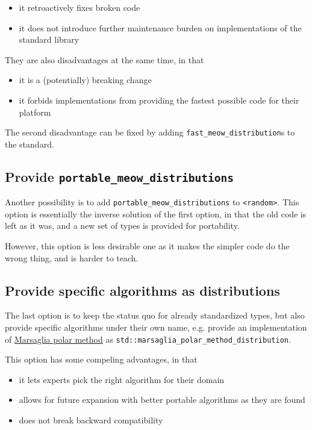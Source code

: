 \documentclass{wg21}
\begin{document}
\begin{itemize}
    \item it retroactively fixes broken code
    \item it does not introduce further maintenance burden on implementations of the standard library
\end{itemize}

They are also disadvantages at the same time, in that

\begin{itemize}
    \item it is a (potentially) breaking change
    \item it forbids implementations from providing the fastest possible code for their platform
\end{itemize}


The second disadvantage can be fixed by adding \texttt{fast_meow_distribution}s
to the standard.


\hypertarget{portable-overloads}{%
    \subsection{Provide \texttt{portable_meow_distributions}}\label{portable-overloads}}

Another possibility is to add \texttt{portable_meow_distributions}
to \texttt{<random>}. This option is essentially the inverse solution
of the first option, in that the old code is left as it was, and
a new set of types is provided for portability.

However, this option is less desirable one as it makes the simpler code
do the wrong thing, and is harder to teach.

\hypertarget{specific-algorithms}{%
    \subsection{Provide specific algorithms as distributions}\label{specific-algorithms}}

The last option is to keep the status quo for already standardized types,
but also provide specific algorithms under their own name, e.g. provide
an implementation of
\href{https://en.wikipedia.org/wiki/Marsaglia_polar_method}{Marsaglia polar method}
as \mbox{\texttt{std::marsaglia_polar_method_distribution}}.

This option has some compeling advantages, in that

\begin{itemize}
    \item it lets experts pick the right algorithm for their domain
    \item allows for future expansion with better portable algorithms as they are found
    \item does not break backward compatibility
\end{itemize}
\end{document}
